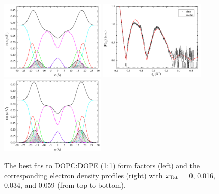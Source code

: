 \begin{figure}[htbp]
  \includegraphics[width=0.45\textwidth,valign=t]{./figures/Tat/SDP_Results/EDP/DOPCDOPE1to1_Tat_28to1_3p0_EDP1}
  \includegraphics[width=0.45\textwidth,valign=t]{figures/Tat/SDP_Results/XFF/DOPCDOPE1to1_Tat_16to1_3p0_XFF1}
  \includegraphics[width=0.45\textwidth,valign=t]{./figures/Tat/SDP_Results/EDP/DOPCDOPE1to1_Tat_16to1_3p0_EDP1}
  \caption{The best fits to DOPC:DOPE (1:1) form factors (left) and the corresponding 
  electron density profiles (right) with $x_\textrm{Tat}$ = 0, 0.016, 0.034, 
  and 0.059 (from top to bottom).}
  \label{fig:DOPCDOPE1to1_Tat_XFF1}
\end{figure}

